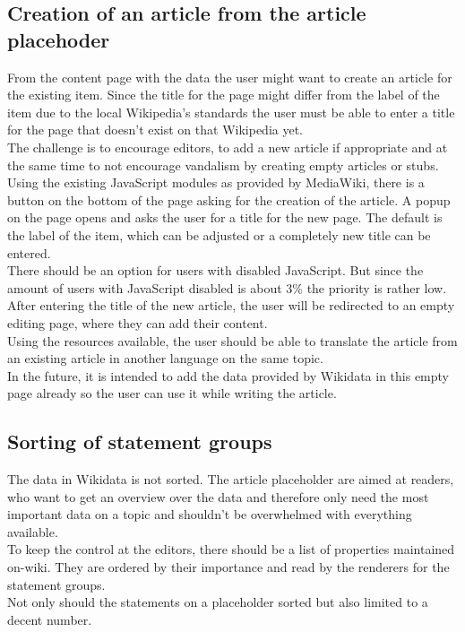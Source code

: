 \documentclass[11pt]{article}
\begin{document}
\subsection{Creation of an article from the article placehoder}
From the content page with the data the user might want to create an article for the existing item. Since the title for the page might differ from the label of the item due to the local Wikipedia's standards the user must be able to enter a title for the page that doesn't exist on that Wikipedia yet. \\
The challenge is to encourage editors, to add a new article if appropriate and at the same time to not encourage vandalism by creating empty articles or stubs.\\
Using the existing JavaScript modules as provided by MediaWiki, there is a button on the bottom of the page asking for the creation of the article. A popup on the page opens and asks the user for a title for the new page. The default is the label of the item, which can be adjusted or a completely new title can be entered. \\
There should be an option for users with disabled JavaScript. But since the amount of users with JavaScript disabled is about 3\% %
the priority is rather low. \\
After entering the title of the new article, the user will be redirected to an empty editing page, where they can add their content. \\
Using the resources available, the user should be able to translate the article from an existing article in another language on the same topic. \\
In the future, it is intended to add the data provided by Wikidata in this empty page already so the user can use it while writing the article. 

\subsection{Sorting of statement groups}
The data in Wikidata is not sorted. The article placeholder are aimed at readers, who want to get an overview over the data and therefore only need the most important data on a topic and shouldn't be overwhelmed with everything available. 
\\
To keep the control at the editors, there should be a list of properties maintained on-wiki. They are ordered by their importance and read by the renderers for the statement groups. \\
Not only should the statements on a placeholder sorted but also limited to a decent number.
\end{document}
